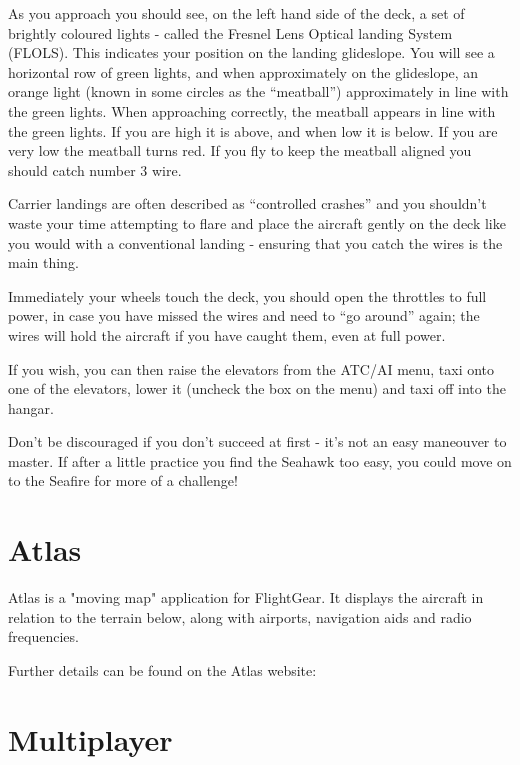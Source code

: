 As you approach you should see, on the left hand side of the deck, a set of brightly coloured lights - called 
the Fresnel Lens Optical landing System (FLOLS). This indicates your position on the landing glideslope. 
You will see a horizontal row of green lights, and when approximately on the glideslope, an orange light 
(known in some circles as the ``meatball'') approximately in line with the green lights. When approaching 
correctly, the meatball appears in line with the green lights. If you are high it is above, and when low 
it is below. If you are very low the meatball turns red. If you fly to keep the meatball aligned you 
should catch number 3 wire.

Carrier landings are often described as ``controlled crashes'' and you shouldn't waste your time attempting 
to flare and place the aircraft gently on the deck like you would with a conventional landing - ensuring that 
you catch the wires is the main thing.

Immediately your wheels touch the deck, you should open the throttles to full power, in case you have 
missed the wires and need to ``go around'' again; the wires will hold the aircraft if you have caught them, 
even at full power.

If you wish, you can then raise the elevators from the ATC/AI menu, taxi onto one of the elevators, 
lower it (uncheck the box on the menu) and taxi off into the hangar.

Don't be discouraged if you don't succeed at first - it's not an easy maneouver to master. If after a little 
practice you find the Seahawk too easy, you could move on to the Seafire for more of a challenge! 


\section{Atlas\label{Atlas}}

Atlas is a "moving map" application for FlightGear. It displays the aircraft in relation to the terrain below, 
along with airports, navigation aids and radio frequencies. 

Further details can be found on the Atlas website:

\noindent
{}

\section{Multiplayer}

